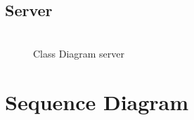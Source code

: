        \subsection{Server}
            \begin{figure}[htbp!]
                \includegraphics[width=0.35\linewidth]{Immagini/Diagrammi/Class Diagram/ClassDiagramServer.pdf}
            \caption{Class Diagram server}
            \label{fig:Class Diagram server}
            \end{figure}

    \clearpage
    
    \section{Sequence Diagram}
